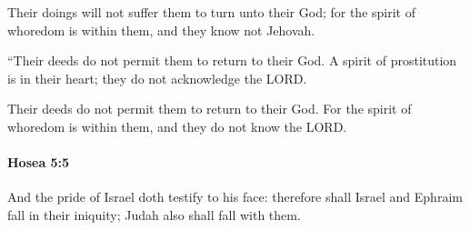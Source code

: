 			\begin{versebox}
					\item[BHS] 
					\item[LXX] 
					\item[ASV] Their doings will not suffer them to turn unto their God; for the spirit of whoredom is within them, and they know not Jehovah.
					\item[NIV] “Their deeds do not permit them to return to their God. A spirit of prostitution is in their heart; they do not acknowledge the LORD.
					\item[NRSV] Their deeds do not permit them to return to their God. For the spirit of whoredom is within them, and they do not know the LORD.
			\end{versebox}

		\paragraph{Hosea 5:5} %
			\label{HOSEA-5-5}

			And the pride of Israel doth testify to his face: therefore shall Israel and Ephraim fall in their iniquity; Judah also shall fall with them.

